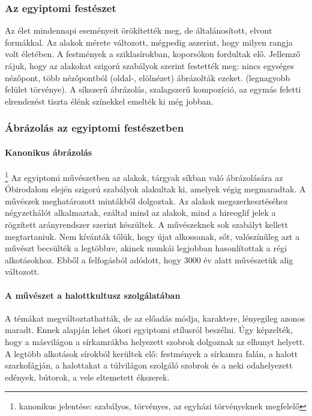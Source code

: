 \subsubsection{Az egyiptomi festészet}

Az élet mindennapi eseményeit örökítették meg, de általánosított, elvont formákkal. Az
alakok mérete változott, mégpedig aszerint, hogy milyen rangja volt életében.
A festmények a sziklasírokban, koporsókon fordultak elő. Jellemző rájuk, hogy az alakokat
szigorú szabályok szerint festették meg: nincs egységes nézőpont, több nézőpontból (oldal-,
elölnézet) ábrázolták ezeket. (legnagyobb felület törvénye). A síkszerű ábrázolás, szalagszerű
kompozíció, az egymás feletti elrendezést tiszta élénk színekkel emelték ki még jobban. 


\subsubsection{Ábrázolás az egyiptomi festészetben}

\paragraph{Kanonikus ábrázolás} \footnote{kanonikus jelentése: szabályos, törvényes, az egyházi törvényeknek megfelelő}
Az egyiptomi művészetben az alakok, tárgyak síkban való ábrázolására az Óbirodalom elején szigorú szabályok alakultak ki, amelyek végig megmaradtak. A művészek meghatározott mintákből dolgoztak. Az alakok megszerkesztéséhez négyzethálót alkalmaztak, ezáltal mind az alakok, mind a hireoglif jelek a rögzített arányrendszer szerint készültek. A művészeknek sok szabályt kellett megtartaniuk. Nem kívánták tőlük, hogy újat alkossanak, sőt, valószínűleg azt a művészt becsülték a legtöbbre, akinek munkái legjobban hasonlítottak a régi alkotásokhoz. Ebből a felfogásból adódott, hogy 3000 év alatt művészetük alig változott.

\paragraph{A művészet a halottkultusz szolgálatában}
A témákat megváltoztathatták, de az előadás módja, karaktere, lényegileg azonos maradt. Ennek alapján lehet ókori egyiptomi stílusról beszélni. Úgy képzelték, hogy a másvilágon a sírkamrákba helyezett szobrok dolgoznak az elhunyt helyett. A legtöbb alkotások sírokból kerültek elő: festmények a sírkamra falán, a halott szarkofágján, a halottakat a túlvilágon szolgáló szobrok és a neki odahelyezett edények, bútorok, a vele eltemetett ékszerek.

